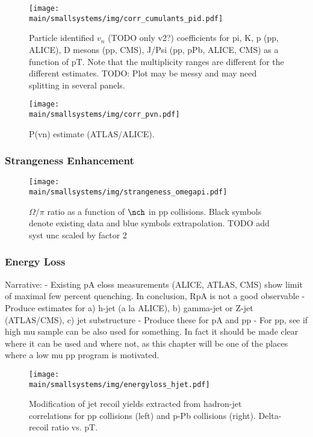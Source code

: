 \documentclass[../report.tex]{subfiles}
\providecommand{\main}{..}
\begin{document}
\begin{figure}[ht]
\centering
\texttt{[image: \\main/smallsystems/img/corr\_cumulants\_pid.pdf]}
\caption{Particle identified $v_n$ (TODO only v2?) coefficients for pi, K, p (pp, ALICE), D mesons (pp, CMS), J/Psi (pp, pPb, ALICE, CMS) as a function of pT. Note that the multiplicity ranges are different for the different estimates. TODO: Plot may be messy and may need splitting in several panels.}
\label{fig:smallsystems_corr_cumulants_pid}
\end{figure}

\begin{figure}[ht]
\centering
\texttt{[image: \\main/smallsystems/img/corr\_pvn.pdf]}
\caption{P(vn) estimate (ATLAS/ALICE).}
\label{fig:smallsystems_corr_pvn}
\end{figure}

\subsubsection{Strangeness Enhancement}

\begin{figure}[ht]
\centering
\texttt{[image: \\main/smallsystems/img/strangeness\_omegapi.pdf]}
\caption{$\Omega/\pi$ ratio as a function of $\nch$ in pp collisions. Black symbols denote existing data \cite{ALICE:2017jyt} and blue symbols extrapolation. TODO add syst unc scaled by factor 2}
\label{fig:smallsystems_strangeness_omega_pi}
\end{figure}

\subsubsection{Energy Loss}

Narrative: 
- Existing pA eloss measurements (ALICE, ATLAS, CMS) show limit of maximal few percent quenching. In conclusion, RpA is not a good observable
- Produce estimates for a) h-jet (a la ALICE), b) gamma-jet or Z-jet (ATLAS/CMS), c) jet substructure
- Produce these for pA and pp
- For pp, see if high mu sample can be also used for something. In fact it should be made clear where it can be used and where not, as this chapter will be one of the places where a low mu pp program is motivated.

\begin{figure}[ht]
\centering
\texttt{[image: \\main/smallsystems/img/energyloss\_hjet.pdf]}
\caption{Modification of jet recoil yields extracted from hadron-jet correlations for pp collisions (left) and p-Pb collisions (right). Delta-recoil ratio vs. pT.}
\label{fig:smallsystems_energyloss_hjet}
\end{figure}
\end{document}
